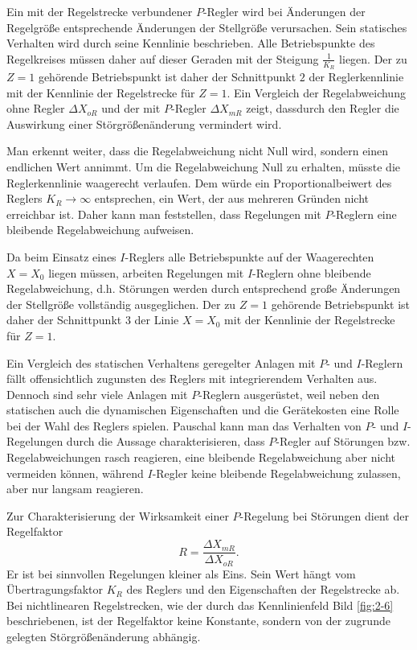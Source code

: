 Ein mit der Regelstrecke verbundener \(P\)-Regler wird bei Änderungen der Regelgröße entsprechende Änderungen der Stellgröße verursachen.
Sein statisches Verhalten wird durch seine Kennlinie beschrieben.
Alle Betriebspunkte des Regelkreises müssen daher auf dieser Geraden mit der Steigung \(\frac{1}{K_R}\) liegen.
Der zu \(Z = 1\) gehörende Betriebspunkt ist daher der Schnittpunkt \(2\) der Reglerkennlinie mit der Kennlinie der Regelstrecke für \(Z = 1\).
Ein Vergleich der Regelabweichung ohne Regler \(\Delta X_{oR}\) und der mit \(P\)-Regler \(\Delta X_{mR}\) zeigt, dassdurch den Regler die Auswirkung einer Störgrößenänderung vermindert wird.

Man erkennt weiter, dass die Regelabweichung nicht Null wird, sondern einen endlichen Wert annimmt.
Um die Regelabweichung Null zu erhalten, müsste die Reglerkennlinie waagerecht verlaufen.
Dem würde ein Proportionalbeiwert des Reglers \(K_R \to \infty\) entsprechen, ein Wert, der aus mehreren Gründen nicht erreichbar ist.
Daher kann man feststellen, dass Regelungen mit \(P\)-Reglern eine bleibende Regelabweichung aufweisen.

Da beim Einsatz eines \(I\)-Reglers alle Betriebspunkte auf der Waagerechten \(X = X_0\) liegen müssen, arbeiten Regelungen mit \(I\)-Reglern ohne bleibende Regelabweichung, d.h. Störungen werden durch entsprechend große Änderungen der Stellgröße vollständig ausgeglichen.
Der zu \(Z = 1\) gehörende Betriebspunkt ist daher der Schnittpunkt \(3\) der Linie \(X = X_0\) mit der Kennlinie der Regelstrecke für \(Z = 1\).

Ein Vergleich des statischen Verhaltens geregelter Anlagen mit \(P\)- und \(I\)-Reglern fällt offensichtlich zugunsten des Reglers mit integrierendem Verhalten aus.
Dennoch sind sehr viele Anlagen mit \(P\)-Reglern ausgerüstet, weil neben den statischen auch die dynamischen Eigenschaften und die Gerätekosten eine Rolle bei der Wahl des Reglers spielen.
Pauschal kann man das Verhalten von \(P\)- und \(I\)-Regelungen durch die Aussage charakterisieren, dass \(P\)-Regler auf Störungen bzw. Regelabweichungen rasch reagieren, eine bleibende Regelabweichung aber nicht vermeiden können, während \(I\)-Regler keine bleibende Regelabweichung zulassen, aber nur langsam reagieren.

Zur Charakterisierung der Wirksamkeit einer \(P\)-Regelung bei Störungen dient der Regelfaktor
\begin{equation}
    R = \frac{\Delta X_{mR}}{\Delta X_{oR}}.
\end{equation}
Er ist bei sinnvollen Regelungen kleiner als Eins.
Sein Wert hängt vom Übertragungsfaktor \(K_R\) des Reglers und den Eigenschaften der Regelstrecke ab.
Bei nichtlinearen Regelstrecken, wie der durch das Kennlinienfeld Bild \ref{fig:2-6} beschriebenen, ist der Regelfaktor keine Konstante, sondern von der zugrunde gelegten Störgrößenänderung abhängig.

